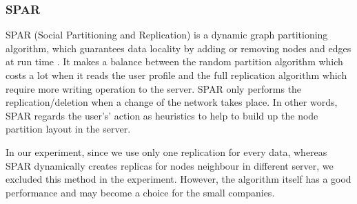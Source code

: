 \subsubsection{SPAR}

SPAR (Social Partitioning and Replication) is a dynamic graph partitioning algorithm, which guarantees data locality by adding or removing nodes and edges at run time \cite{DBLP:journals/ton/PujolESYLCR12}. It makes a balance between the random partition algorithm which costs a lot when it reads the user profile and the full replication algorithm which require more writing operation to the server. SPAR only performs the replication/deletion when a change of the network takes place. In other words, SPAR regards the user's’ action as heuristics to help to build up the node partition layout in the server.

In our experiment, since we use only one replication for every data, whereas SPAR dynamically creates replicas for nodes neighbour in different server, we excluded this method in the experiment. However, the algorithm itself has a good performance and may become a choice for the small companies.